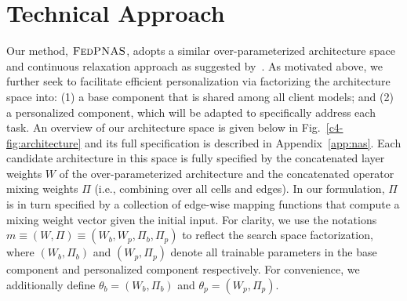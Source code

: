 \section{Technical Approach}
Our method, $\textsc{FedPNAS}$, adopts a similar over-parameterized architecture space and continuous relaxation approach as suggested by~\citet{hu2020}. As motivated above, we further seek to facilitate efficient personalization via factorizing the architecture space into: (1) a base component that is shared among all client models; and (2) a personalized component, which will be adapted to specifically address each task. An overview of our architecture space is given below in Fig.~\ref{c4-fig:architecture} and its full specification is described in Appendix~\ref{app:nas}. Each candidate architecture in this space is fully specified by the concatenated layer weights $W$ of the over-parameterized architecture and the concatenated operator mixing weights $\Pi$ (i.e., combining over all cells and edges). In our formulation, $\Pi$ is in turn specified by a collection of edge-wise mapping functions that compute a mixing weight vector given the initial input. For clarity, we use the notations $m \equiv (W, \Pi) \equiv (W_b, W_p, \Pi_b, \Pi_p)$ to reflect the search space factorization, where $(W_b, \Pi_b)$ and $(W_p, \Pi_p)$ denote all trainable parameters in the base component and personalized component respectively. For convenience, we additionally define $\theta_b=(W_b, \Pi_b)$ and $\theta_p=(W_p, \Pi_p)$.

